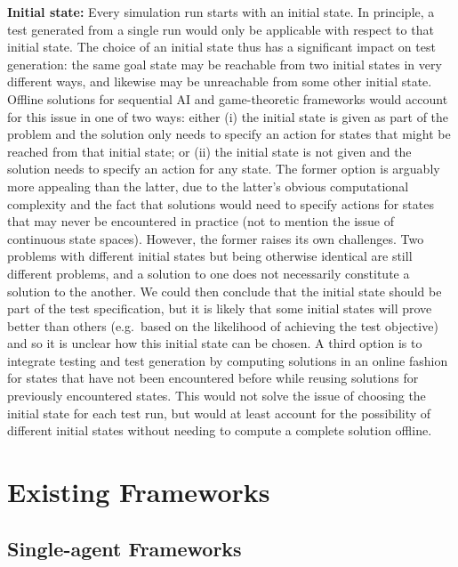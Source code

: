 \documentclass[10pt]{article}
\theoremstyle{plain}
\newenvironment{note}[1][]{\par\smallskip\noindent\textbf{#1}\rmfamily}{\smallskip}
\begin{document}
\begin{note}[Initial state:]
    Every simulation run starts with an initial state.
    In principle, a test generated from a single run would only be applicable with respect to that initial state.
    The choice of an initial state thus has a significant impact on test generation: the same goal state may be reachable from two initial states in very different ways, and likewise may be unreachable from some other initial state.
    Offline solutions for sequential AI and game-theoretic frameworks would account for this issue in one of two ways: either
    (i) the initial state is given as part of the problem and the solution only needs to specify an action for states that might be reached from that initial state; or
    (ii) the initial state is not given and the solution needs to specify an action for any state.
    The former option is arguably more appealing than the latter, due to the latter's obvious computational complexity and the fact that solutions would need to specify actions for states that may never be encountered in practice (not to mention the issue of continuous state spaces).
    However, the former raises its own challenges.
    Two problems with different initial states but being otherwise identical are still different problems, and a solution to one does not necessarily constitute a solution to the another.
    We could then conclude that the initial state should be part of the test specification, but it is likely that some initial states will prove better than others (e.g.\ based on the likelihood of achieving the test objective) and so it is unclear how this initial state can be chosen.
    A third option is to integrate testing and test generation by computing solutions in an online fashion for states that have not been encountered before while reusing solutions for previously encountered states.
    This would not solve the issue of choosing the initial state for each test run, but would at least account for the possibility of different initial states without needing to compute a complete solution offline.
\end{note}

\section{Existing Frameworks}

\subsection{Single-agent Frameworks}
\end{document}
